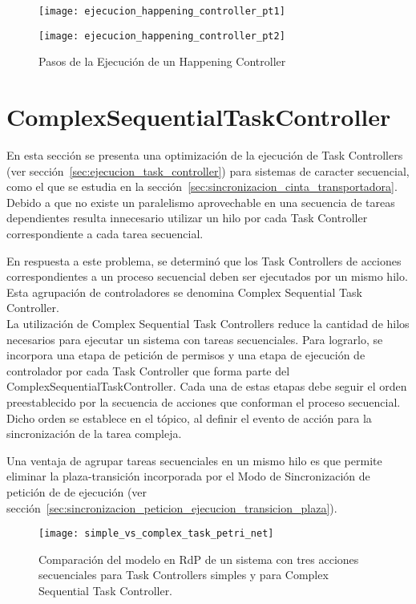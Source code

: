 \begin{figure}[H]
	\centering
	\texttt{[image: ejecucion\_happening\_controller\_pt1]}
\end{figure}
\begin{figure}[H]
	\centering
	\texttt{[image: ejecucion\_happening\_controller\_pt2]}
	\caption{Pasos de la Ejecución de un Happening Controller}
	\label{fig:ejecucion_happening_controller}
\end{figure}

\section{ComplexSequentialTaskController}
\label{sec:complex_sequential_task_controller}
En esta sección se presenta una optimización de la ejecución de Task Controllers
(ver sección~\ref{sec:ejecucion_task_controller}) para sistemas de caracter
secuencial, como el que se estudia en la
sección~\ref{sec:sincronizacion_cinta_transportadora}.
Debido a que no existe un paralelismo aprovechable en una secuencia de
tareas dependientes resulta innecesario utilizar un hilo
por cada Task Controller correspondiente a cada tarea secuencial.

En respuesta a este problema, se determinó que los Task Controllers de acciones
correspondientes a un proceso secuencial deben ser ejecutados por un mismo hilo.
Esta agrupación de controladores se denomina Complex Sequential Task
Controller.
\\
La utilización de Complex Sequential Task Controllers reduce la
cantidad de hilos necesarios para ejecutar un sistema con tareas secuenciales.
Para lograrlo, se incorpora una etapa de petición de permisos y una etapa de
ejecución de controlador por cada Task Controller que forma parte del
ComplexSequentialTaskController. Cada una de estas etapas debe seguir el orden
preestablecido por la secuencia de acciones que conforman el proceso secuencial.
Dicho orden se establece en el tópico, al definir el evento de acción para la
sincronización de la tarea compleja.

Una ventaja de agrupar tareas secuenciales en un mismo hilo es que permite
eliminar la plaza-transición incorporada por el Modo de Sincronización de
petición de de ejecución (ver sección~\ref{sec:sincronizacion_peticion_ejecucion_transicion_plaza}).

\begin{figure}[H]
	\centering
	\texttt{[image: simple\_vs\_complex\_task\_petri\_net]}
	\caption{Comparación del modelo en RdP de un sistema con tres
	acciones secuenciales para Task Controllers simples y para Complex Sequential
	Task Controller.}
	\label{fig:simple_task_vs_complex_task_petri_net}
\end{figure}


